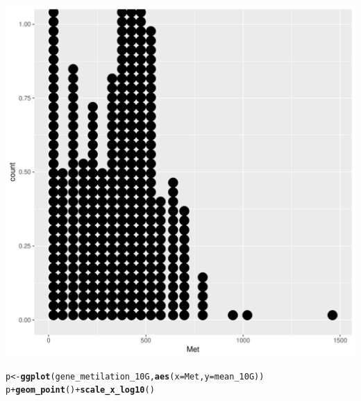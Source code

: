 \documentclass[12pt, a4paper]{article}\usepackage[]{graphicx}\usepackage[]{color}
\makeatletter
\def\maxwidth{ %
  \ifdim\Gin@nat@width>\linewidth
    \linewidth
  \else
    \Gin@nat@width
  \fi
}
\newcommand{\hlopt}[1]{\textcolor[rgb]{0,0,0}{#1}}%
\newcommand{\hlstd}[1]{\textcolor[rgb]{0.345,0.345,0.345}{#1}}%
\newcommand{\hlkwb}[1]{\textcolor[rgb]{0.69,0.353,0.396}{#1}}%
\newcommand{\hlkwc}[1]{\textcolor[rgb]{0.333,0.667,0.333}{#1}}%
\newcommand{\hlkwd}[1]{\textcolor[rgb]{0.737,0.353,0.396}{\textbf{#1}}}%
\newenvironment{kframe}{%
 \def\at@end@of@kframe{}%
 \ifinner\ifhmode%
  \def\at@end@of@kframe{\end{minipage}}%
  \begin{minipage}{\columnwidth}%
 \fi\fi%
 \def\FrameCommand##1{\hskip\@totalleftmargin \hskip-\fboxsep
 \colorbox{shadecolor}{##1}\hskip-\fboxsep
     \hskip-\linewidth \hskip-\@totalleftmargin \hskip\columnwidth}%
 \MakeFramed {\advance\hsize-\width
   \@totalleftmargin\z@ \linewidth\hsize
   \@setminipage}}%
 {\par\unskip\endMakeFramed%
 \at@end@of@kframe}
\newenvironment{knitrout}{}{} %
\makeatother
\begin{document}
\begin{knitrout}
\begin{kframe}
{\ttfamily\noindent\color{warningcolor}{\#\# Warning: Removed 1 rows containing non-finite values (stat\_bindot).}}\end{kframe}
\includegraphics[width=\maxwidth]{figure/unnamed-chunk-10-4} 
\begin{kframe}\begin{alltt}
\hlstd{p} \hlkwb{<-} \hlkwd{ggplot}\hlstd{(gene_metilation_10G,} \hlkwd{aes}\hlstd{(}\hlkwc{x} \hlstd{= Met,} \hlkwc{y} \hlstd{= mean_10G))}
\hlstd{p} \hlopt{+} \hlkwd{geom_point}\hlstd{()} \hlopt{+} \hlkwd{scale_x_log10}\hlstd{()}
\end{alltt}



\end{kframe}
\end{knitrout}
\end{document}

